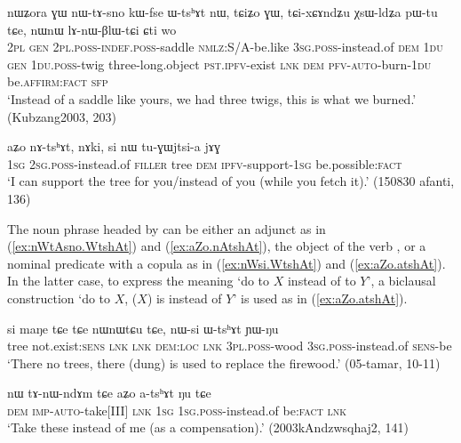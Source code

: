 \begin{exe}
\ex \label{ex:nWtAsno.WtshAt}
\gll nɯʑora ɣɯ nɯ-tɤ-sno kɯ-fse ɯ-tsʰɤt nɯ, tɕiʑo ɣɯ, tɕi-xɕɤndʑu χsɯ-ldʑa pɯ-tu tɕe, nɯnɯ lɤ-nɯ-βlɯ-tɕi ɕti wo \\
\textsc{2pl} \textsc{gen} \textsc{2pl}.\textsc{poss}-\textsc{indef}.\textsc{poss}-saddle \textsc{nmlz}:S/A-be.like \textsc{3sg}.\textsc{poss}-instead.of \textsc{dem} \textsc{1du} \textsc{gen} \textsc{1du}.\textsc{poss}-twig three-long.object \textsc{pst}.\textsc{ipfv}-exist \textsc{lnk} \textsc{dem} \textsc{pfv}-\textsc{auto}-burn-\textsc{1du} be.\textsc{affirm}:\textsc{fact} \textsc{sfp} \\
\glt `Instead of a saddle like yours, we had three twigs, this is what we burned.' (Kubzang2003, 203)
\end{exe}

\begin{exe}
\ex \label{ex:aZo.nAtshAt}
\gll aʑo nɤ-tsʰɤt, nɤki, si nɯ tu-ɣɯjtsi-a jɤɣ \\
\textsc{1sg} \textsc{2sg}.\textsc{poss}-instead.of \textsc{filler} tree \textsc{dem} \textsc{ipfv}-support-\textsc{1sg} be.possible:\textsc{fact} \\
\glt `I can support the tree for you/instead of you (while you fetch it).' (150830 afanti, 136)
\end{exe}

 The noun phrase headed by  can be either an adjunct as in (\ref{ex:nWtAsno.WtshAt}) and (\ref{ex:aZo.nAtshAt}), the object of the verb , or a nominal predicate with a copula as in (\ref{ex:nWsi.WtshAt}) and (\ref{ex:aZo.atshAt}).  In the latter case, to express the meaning `do to $X$ instead of to $Y$', a biclausal construction `do to $X$, ($X$) is instead of $Y$' is used as in (\ref{ex:aZo.atshAt}).

\begin{exe}
\ex \label{ex:nWsi.WtshAt}
\gll si maŋe tɕe tɕe nɯnɯtɕu tɕe, nɯ-si ɯ-tsʰɤt ɲɯ-ŋu  \\
tree not.exist:\textsc{sens} \textsc{lnk} \textsc{lnk} \textsc{dem}:\textsc{loc} \textsc{lnk} \textsc{3pl}.\textsc{poss}-wood \textsc{3sg}.\textsc{poss}-instead.of \textsc{sens}-be \\
\glt `There no trees, there (dung) is used to replace the firewood.' (05-tamar, 10-11)
\end{exe}


\begin{exe}
\ex \label{ex:aZo.atshAt}
\gll nɯ tɤ-nɯ-ndɤm tɕe aʑo a-tsʰɤt ŋu tɕe \\
\textsc{dem} \textsc{imp}-\textsc{auto}-take[III] \textsc{lnk} \textsc{1sg} \textsc{1sg}.\textsc{poss}-instead.of be:\textsc{fact} \textsc{lnk} \\
\glt `Take these instead of me (as a compensation).' (2003kAndzwsqhaj2, 141)
\end{exe}

